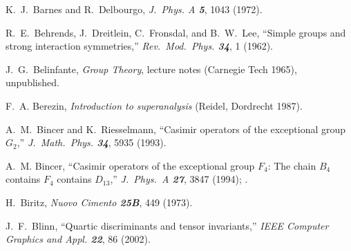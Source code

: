  K.~J.~Barnes and R.~Delbourgo,
    {\em J.~Phys. A  \bf 5}, 1043 (1972).

%


R.~E.~Behrends, J.~Dreitlein, C.~Fronsdal, and B.~W.~Lee,
``Simple groups and strong interaction symmetries,''
{\em Rev.~Mod.~Phys. \bf 34}, 1 (1962).


  J.~G.~Belinfante,
    {\em Group Theory}, lecture notes
    (Carnegie Tech 1965), unpublished.


 F.~A. Berezin,
    {\em Introduction to superanalysis}
    (Reidel, Dordrecht 1987).


A.~M.~Bincer and K.~Riesselmann,
``Casimir operators of the exceptional group $G_2$,''
{\em J.~Math.~Phys. \bf 34}, 5935 (1993).

 A.~M. Bincer,
    ``Casimir operators of the exceptional group $F_4$:
    The chain $B_4$ contains $F_4$ contains $D_{13}$,''
    {\em J.~Phys.~A  \bf 27}, 3847 (1994);
    .

 H.~Biritz,
    {\em Nuovo Cimento \bf 25B}, 449 (1973).

 J.~F.~Blinn,
    ``Quartic discriminants and tensor invariants,''
{\em IEEE Computer Graphics and Appl. \bf 22}, 86 (2002). %


